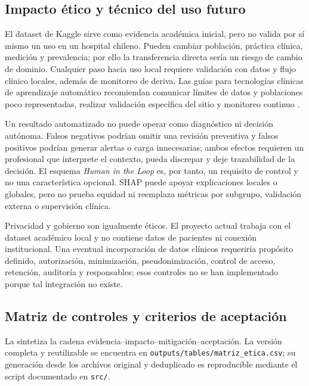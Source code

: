 \subsection{Impacto ético y técnico del uso futuro}

El dataset de Kaggle sirve como evidencia académica inicial, pero no valida por sí mismo un uso en un hospital chileno. Pueden cambiar población, práctica clínica, medición y prevalencia; por ello la transferencia directa sería un riesgo de cambio de dominio. Cualquier paso hacia uso local requiere validación con datos y flujo clínico locales, además de monitoreo de deriva. Las guías para tecnologías clínicas de aprendizaje automático recomiendan comunicar límites de datos y poblaciones poco representadas, realizar validación específica del sitio y monitoreo continuo \parencite{fda-transparency-mlmd}.

Un resultado automatizado no puede operar como diagnóstico ni decisión autónoma. Falsos negativos podrían omitir una revisión preventiva y falsos positivos podrían generar alertas o carga innecesarias; ambos efectos requieren un profesional que interprete el contexto, pueda discrepar y deje trazabilidad de la decisión. El esquema \emph{Human in the Loop} es, por tanto, un requisito de control y no una característica opcional. SHAP puede apoyar explicaciones locales o globales, pero no prueba equidad ni reemplaza métricas por subgrupo, validación externa o supervisión clínica.

Privacidad y gobierno son igualmente éticos. El proyecto actual trabaja con el dataset académico local y no contiene datos de pacientes ni conexión institucional. Una eventual incorporación de datos clínicos requeriría propósito definido, autorización, minimización, pseudonimización, control de acceso, retención, auditoría y responsables; esos controles no se han implementado porque tal integración no existe.

\subsection{Matriz de controles y criterios de aceptación}

La  sintetiza la cadena evidencia--impacto--mitigación--aceptación. La versión completa y reutilizable se encuentra en \texttt{outputs/tables/matriz\_etica.csv}; su generación desde los archivos original y deduplicado es reproducible mediante el script documentado en \texttt{src/}.



